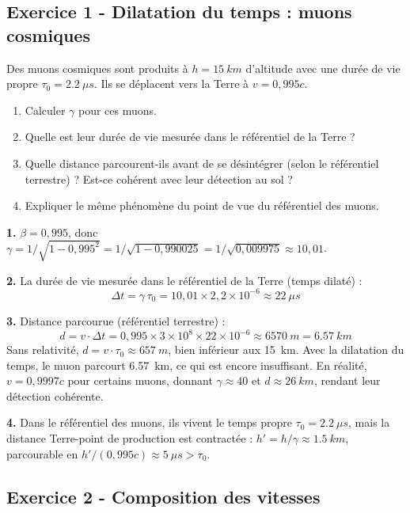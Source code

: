 \documentclass[12pt,a4paper]{article}
\begin{document}
\subsection*{Exercice 1 - Dilatation du temps : muons cosmiques \niveau{\facile}}

\begin{boiteexercice}
Des muons cosmiques sont produits à $h = \qty{15}{km}$ d'altitude avec une durée de vie propre $\tau_0 = \qty{2.2}{\mu s}$. Ils se déplacent vers la Terre à $v = 0{,}995c$.
\begin{enumerate}
  \item Calculer $\gamma$ pour ces muons.
  \item Quelle est leur durée de vie mesurée dans le référentiel de la Terre ?
  \item Quelle distance parcourent-ils avant de se désintégrer (selon le référentiel terrestre) ? Est-ce cohérent avec leur détection au sol ?
  \item Expliquer le même phénomène du point de vue du référentiel des muons.
\end{enumerate}
\end{boiteexercice}

\begin{boitecorrige}
\textbf{1.} $\beta = 0{,}995$, donc $\gamma = 1/\sqrt{1-0{,}995^2} = 1/\sqrt{1-0{,}990025} = 1/\sqrt{0{,}009975} \approx 10{,}01$.

\textbf{2.} La durée de vie mesurée dans le référentiel de la Terre (temps dilaté) :
\[
\Delta t = \gamma\,\tau_0 = 10{,}01\times2{,}2\times10^{-6} \approx \qty{22}{\mu s}
\]

\textbf{3.} Distance parcourue (référentiel terrestre) :
\[
d = v\cdot\Delta t = 0{,}995\times3\times10^8\times22\times10^{-6} \approx \qty{6570}{m} = \qty{6.57}{km}
\]
Sans relativité, $d = v\cdot\tau_0 \approx \qty{657}{m}$, bien inférieur aux \qty{15}{km}.
Avec la dilatation du temps, le muon parcourt \qty{6.57}{km}, ce qui est encore insuffisant.
En réalité, $v = 0{,}9997c$ pour certains muons, donnant $\gamma \approx 40$ et
$d \approx \qty{26}{km}$, rendant leur détection cohérente.

\textbf{4.} Dans le référentiel des muons, ils vivent le temps propre $\tau_0 = \qty{2.2}{\mu s}$,
mais la distance Terre-point de production est contractée : $h' = h/\gamma \approx \qty{1.5}{km}$,
parcourable en $h'/(0{,}995c) \approx \qty{5}{\mu s} > \tau_0$.
\end{boitecorrige}

\subsection*{Exercice 2 - Composition des vitesses \niveau{\moyen}}
\end{document}
